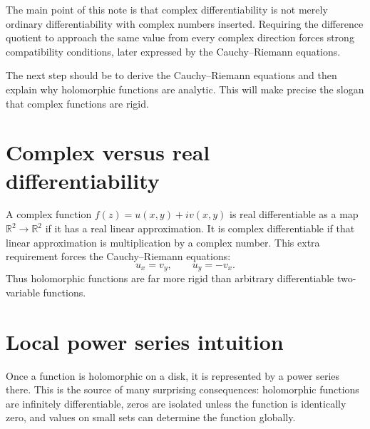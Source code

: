 The main point of this note is that complex differentiability is not merely ordinary differentiability with complex numbers inserted.  Requiring the difference quotient to approach the same value from every complex direction forces strong compatibility conditions, later expressed by the Cauchy--Riemann equations.

\begin{remark}
The next step should be to derive the Cauchy--Riemann equations and then explain why holomorphic functions are analytic.  This will make precise the slogan that complex functions are rigid.
\end{remark}


\section{Complex versus real differentiability}

A complex function \(f(z)=u(x,y)+iv(x,y)\) is real differentiable as a map \(\mathbb R^2\to\mathbb R^2\) if it has a real linear approximation.  It is complex differentiable if that linear approximation is multiplication by a complex number.  This extra requirement forces the Cauchy--Riemann equations:
\[
  u_x=v_y,\qquad u_y=-v_x.
\]
Thus holomorphic functions are far more rigid than arbitrary differentiable two-variable functions.

\section{Local power series intuition}

Once a function is holomorphic on a disk, it is represented by a power series there.  This is the source of many surprising consequences: holomorphic functions are infinitely differentiable, zeros are isolated unless the function is identically zero, and values on small sets can determine the function globally.

